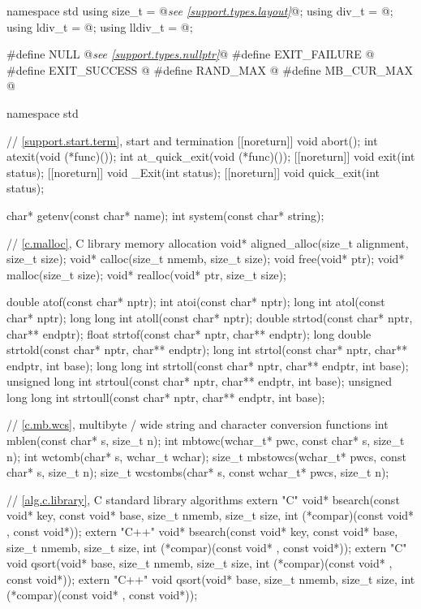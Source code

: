 \begin{codeblock}
namespace std {
  using size_t = @\textit{see \ref{support.types.layout}}@;
  using div_t = @\seebelow@;
  using ldiv_t = @\seebelow@;
  using lldiv_t = @\seebelow@;
}

#define NULL @\textit{see \ref{support.types.nullptr}}@
#define EXIT_FAILURE @\seebelow@
#define EXIT_SUCCESS @\seebelow@
#define RAND_MAX @\seebelow@
#define MB_CUR_MAX @\seebelow@

namespace std {
  // \ref{support.start.term}, start and termination
  [[noreturn]] void abort();
  int atexit(void (*func)());
  int at_quick_exit(void (*func)());
  [[noreturn]] void exit(int status);
  [[noreturn]] void _Exit(int status);
  [[noreturn]] void quick_exit(int status);

  char* getenv(const char* name);
  int system(const char* string);

  // \ref{c.malloc}, C library memory allocation
  void* aligned_alloc(size_t alignment, size_t size);
  void* calloc(size_t nmemb, size_t size);
  void free(void* ptr);
  void* malloc(size_t size);
  void* realloc(void* ptr, size_t size);

  double atof(const char* nptr);
  int atoi(const char* nptr);
  long int atol(const char* nptr);
  long long int atoll(const char* nptr);
  double strtod(const char* nptr, char** endptr);
  float strtof(const char* nptr, char** endptr);
  long double strtold(const char* nptr, char** endptr);
  long int strtol(const char* nptr, char** endptr, int base);
  long long int strtoll(const char* nptr, char** endptr, int base);
  unsigned long int strtoul(const char* nptr, char** endptr, int base);
  unsigned long long int strtoull(const char* nptr, char** endptr, int base);

  // \ref{c.mb.wcs}, multibyte / wide string and character conversion functions
  int mblen(const char* s, size_t n);
  int mbtowc(wchar_t* pwc, const char* s, size_t n);
  int wctomb(char* s, wchar_t wchar);
  size_t mbstowcs(wchar_t* pwcs, const char* s, size_t n);
  size_t wcstombs(char* s, const wchar_t* pwcs, size_t n);

  // \ref{alg.c.library}, C standard library algorithms
  extern "C" void* bsearch(const void* key, const void* base, size_t nmemb, size_t size,
                           int (*compar)(const void* , const void*));
  extern "C++" void* bsearch(const void* key, const void* base, size_t nmemb, size_t size,
                             int (*compar)(const void* , const void*));
  extern "C" void qsort(void* base, size_t nmemb, size_t size,
                        int (*compar)(const void* , const void*));
  extern "C++" void qsort(void* base, size_t nmemb, size_t size,
                          int (*compar)(const void* , const void*));

}
\end{codeblock}
